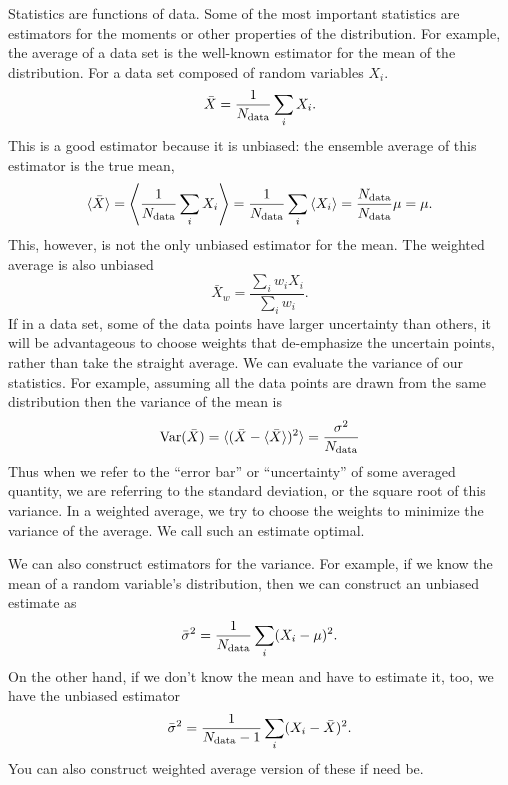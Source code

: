 Statistics are functions of data.  Some of the most important statistics are estimators for the moments or other properties of the distribution.  For example, the average of a data set is the well-known estimator for the mean of the distribution.  For a data set composed of random variables $X_i$.
\begin{equation}
  \bar X = \frac{1}{N_{\rm data}} \sum_i X_i.
\end{equation}
This is a good estimator because it is unbiased: the ensemble average of this estimator is the true mean,
\begin{equation}
  \langle \bar X \rangle = \left\langle \frac{1}{N_{\rm data}} \sum_i X_i \right\rangle =  \frac{1}{N_{\rm data}} \sum_i \left\langle X_i \right\rangle = \frac{N_{\rm data}}{N_{\rm data}} \mu = \mu.
\end{equation}
This, however, is not the only unbiased estimator for the mean.  The weighted average is also unbiased
\begin{equation}
  \bar { X}_w = \frac{ \sum_i w_i X_i}{\sum_i w_i}.
\end{equation}
If in a data set, some of the data points have larger uncertainty than others, it will be advantageous to choose weights that de-emphasize the uncertain points, rather than take the straight average.  We can evaluate the variance of our statistics.  For example, assuming all the data points are drawn from the same distribution then the variance of the mean is
\begin{equation}
 {\rm Var}(\bar X) =  \langle (\bar X - \langle \bar X \rangle)^2 \rangle = \frac{\sigma^2}{N_{\rm data}}
\end{equation}
Thus when we refer to the ``error bar'' or ``uncertainty'' of some averaged quantity, we are referring to the standard deviation, or the square root of this variance.  In a weighted average, we try to choose the weights to minimize the variance of the average.  We call such an estimate optimal.  

We can also construct estimators for the variance.  For example, if we know the mean of a random variable's distribution, then we can construct an unbiased estimate as
\begin{equation}
  \bar \sigma^2 = \frac{1}{N_{\rm data}} \sum_i (X_i - \mu)^2.
\end{equation}
On the other hand, if we don't know the mean and have to estimate it, too, we have the unbiased estimator
\begin{equation}
  \bar \sigma^2 = \frac{1}{N_{\rm data}-1} \sum_i (X_i - \bar X)^2.
\end{equation}
You can also construct weighted average version of these if need be.

